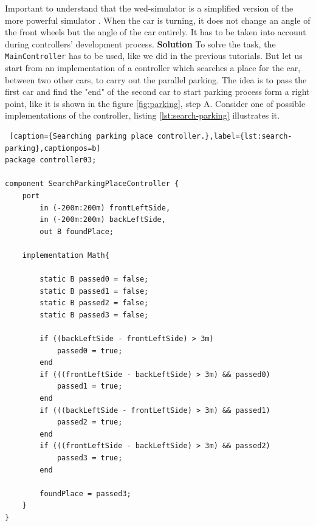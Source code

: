 Important to understand that the wed-simulator is a simplified version of the more powerful simulator \cite{GKR17}. When the car is turning, it does not change an angle of the front wheels but the angle of the car entirely. It has to be taken into account during controllers' development process.\newpage
\textbf{Solution} \newline \newline
To solve the task, the \texttt{MainController} has to be used, like we did in the previous tutorials. But let us start from an implementation of a controller which searches a place for the car, between two other cars, to carry out the parallel parking. The idea is to pass the first car and find the "end" of the second car to start parking process form a right point, like it is shown in the figure \ref{fig:parking}, step A. Consider one of possible implementations of the controller, listing \ref{lst:search-parking} illustrates it.
\bigskip
\begin{lstlisting} [caption={Searching parking place controller.},label={lst:search-parking},captionpos=b]
package controller03;

component SearchParkingPlaceController {
    port
        in (-200m:200m) frontLeftSide,
        in (-200m:200m) backLeftSide,
        out B foundPlace;

    implementation Math{
        
        static B passed0 = false;
        static B passed1 = false;
        static B passed2 = false;
        static B passed3 = false;

        if ((backLeftSide - frontLeftSide) > 3m)
            passed0 = true;
        end
        if (((frontLeftSide - backLeftSide) > 3m) && passed0)
            passed1 = true;
        end
        if (((backLeftSide - frontLeftSide) > 3m) && passed1)
            passed2 = true;
        end
        if (((frontLeftSide - backLeftSide) > 3m) && passed2)
            passed3 = true;
        end
        
        foundPlace = passed3;
    }
}    
\end{lstlisting}
\bigskip
